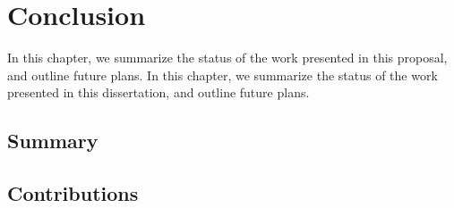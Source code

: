 \chapter{Conclusion}
\label{chap:conclusion}

\if@ms
In this chapter, we summarize the status of the work presented in this proposal, and outline future plans.
\else
In this chapter, we summarize the status of the work presented in this dissertation, and outline future plans.
\fi

\section{Summary}
\label{sec:conclusion:summary}

\lipsum

\section{Contributions}
\label{sec:conclusion:contributions}

\lipsum


